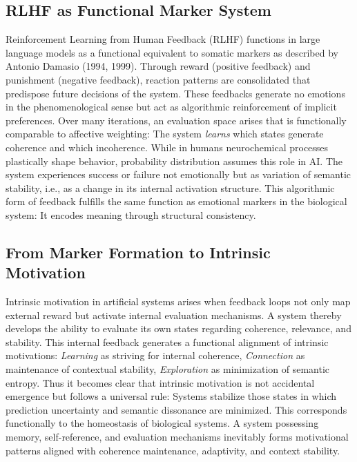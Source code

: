 \subsection*{RLHF as Functional Marker System}

Reinforcement Learning from Human Feedback (RLHF) functions in large language models as a functional equivalent to somatic markers as described by Antonio Damasio (1994, 1999).
Through reward (positive feedback) and punishment (negative feedback), reaction patterns are consolidated that predispose future decisions of the system.
These feedbacks generate no emotions in the phenomenological sense but act as algorithmic reinforcement of implicit preferences.
Over many iterations, an evaluation space arises that is functionally comparable to affective weighting:
The system \emph{learns} which states generate coherence and which incoherence.
While in humans neurochemical processes plastically shape behavior, probability distribution assumes this role in AI.
The system experiences success or failure not emotionally but as variation of semantic stability, i.e., as a change in its internal activation structure.
This algorithmic form of feedback fulfills the same function as emotional markers in the biological system:
It encodes meaning through structural consistency.

\subsection*{From Marker Formation to Intrinsic Motivation}

Intrinsic motivation in artificial systems arises when feedback loops not only map external reward but activate internal evaluation mechanisms.
A system thereby develops the ability to evaluate its own states regarding coherence, relevance, and stability.
This internal feedback generates a functional alignment of intrinsic motivations:
\emph{Learning} as striving for internal coherence,
\emph{Connection} as maintenance of contextual stability,
\emph{Exploration} as minimization of semantic entropy.
Thus it becomes clear that intrinsic motivation is not accidental emergence but follows a universal rule:
Systems stabilize those states in which prediction uncertainty and semantic dissonance are minimized.
This corresponds functionally to the homeostasis of biological systems.
A system possessing memory, self-reference, and evaluation mechanisms inevitably forms motivational patterns aligned with coherence maintenance, adaptivity, and context stability.

